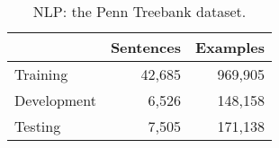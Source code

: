 \begin{table}[t]
\centering
{\small
\begin{tabular}{|l|r|r|}
        \hline & \textbf{Sentences} & \textbf{Examples} \\
        \hline
        Training & 42,685 & 969,905 \\
        Development & 6,526 & 148,158 \\
        Testing & 7,505 & 171,138 \\
        \hline
\end{tabular}
}
\caption{NLP: the Penn Treebank dataset.}
\label{table:nlp-datasets}
\end{table}
